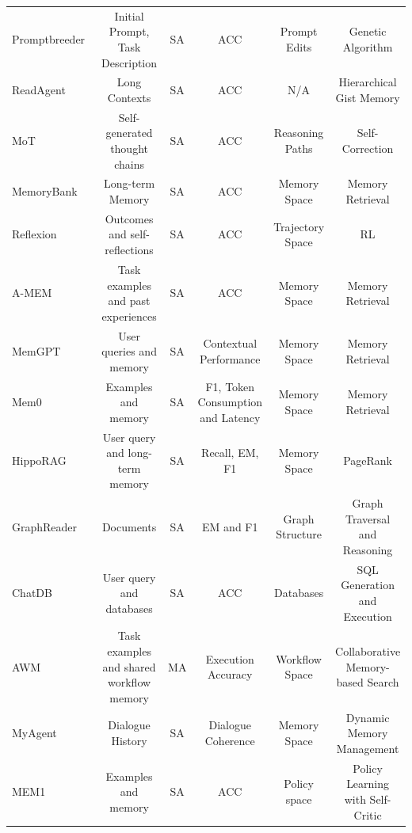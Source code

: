 \begin{table}[t]
{\begin{tabular}{lccccc}
        Promptbreeder~\citep{fernando2024promptbreeder} & Initial Prompt, Task Description & SA & ACC & Prompt Edits & Genetic Algorithm \\

        ReadAgent~\citep{lee2024humaninspiredreadingagentgist} & Long Contexts & SA & ACC & N/A & Hierarchical Gist Memory \\
        
        MoT~\citep{li2023motmemoryofthoughtenableschatgpt} & Self-generated thought chains & SA & ACC & Reasoning Paths & Self-Correction \\
        MemoryBank~\citep{zhong2023memorybankenhancinglargelanguage} & Long-term Memory & SA & ACC & Memory Space & Memory Retrieval\\
        Reflexion~\citep{shinn2023reflexionlanguageagentsverbal} & Outcomes and self-reflections & SA & ACC & Trajectory Space & RL\\
        A-MEM~\citep{xu2025amemagenticmemoryllm} & Task examples and past experiences & SA & ACC & Memory Space &  Memory Retrieval\\
        MemGPT~\citep{packer2024memgptllmsoperatingsystems} & User queries and  memory & SA & Contextual Performance & Memory Space & Memory Retrieval\\
        Mem0~\citep{chhikara2025mem0buildingproductionreadyai} &  Examples and memory & SA & F1, Token Consumption and Latency & Memory Space& Memory Retrieval\\
        HippoRAG~\citep{gutiérrez2025hipporagneurobiologicallyinspiredlongterm} & User query and long-term memory & SA & Recall, EM, F1 &Memory Space & PageRank\\
        GraphReader~\citep{li2024graphreaderbuildinggraphbasedagent} & Documents & SA & EM and F1 & Graph Structure & Graph Traversal and Reasoning\\
        ChatDB~\citep{hu2023chatdbaugmentingllmsdatabases} & User query and databases & SA & ACC & Databases & SQL Generation and Execution\\
        AWM~\citep{wang2024agentworkflowmemory} & Task examples and shared workflow memory & MA & Execution Accuracy & Workflow Space & Collaborative Memory-based Search\\

        MyAgent~\citep{Hou_2024} & Dialogue History & SA & Dialogue Coherence & Memory Space & Dynamic Memory Management \\

        MEM1~\citep{zhou2025mem1learningsynergizememory} & Examples and memory & SA & ACC & Policy space  & Policy Learning with Self-Critic \\


\end{tabular}}
\end{table}
